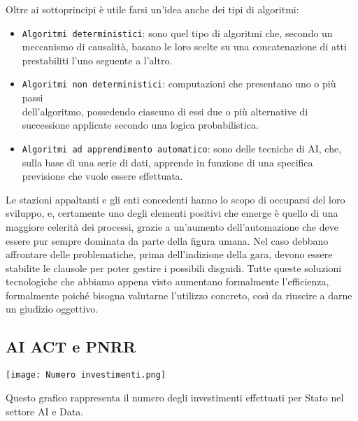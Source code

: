 \documentclass{article}
\begin{document}
\begin{justify}
\begin{itemize}
    \end{itemize}
    Oltre ai sottoprincipi è utile farsi un'idea anche dei tipi di algoritmi:
    \begin{itemize}
        \item \texttt{Algoritmi deterministici}: sono quel tipo di algoritmi che, secondo un meccanismo di causalità, basano le loro scelte su una concatenazione di atti prestabiliti l'uno seguente a l'altro.
        \item \texttt{Algoritmi non deterministici}: computazioni che presentano uno o più passi\\ dell'algoritmo, possedendo ciascuno di essi due o più alternative di successione applicate secondo una logica probabilistica.
        \item \texttt{Algoritmi ad apprendimento automatico}: sono delle tecniche di AI, che, sulla base di una serie di dati, apprende in funzione di una specifica previsione che vuole essere effettuata.
    \end{itemize}
    Le stazioni appaltanti e gli enti concedenti hanno lo scopo di occuparsi del loro sviluppo, e, certamente uno degli elementi positivi che emerge è quello di una maggiore celerità dei processi, grazie a un'aumento dell'automazione che deve essere pur sempre dominata da parte della figura umana. Nel caso debbano affrontare delle problematiche, prima dell'indizione della gara, devono essere stabilite le clausole per poter gestire i possibili disguidi.
    Tutte queste soluzioni tecnologiche che abbiamo appena visto aumentano formalmente l'efficienza, formalmente poiché bisogna valutarne l'utilizzo concreto, così da riuscire a darne un giudizio oggettivo.\\
\end{justify}

\newpage\subsection{AI ACT e PNRR}
\begin{center}
    \texttt{[image: Numero investimenti.png]}
\end{center}
\begin{center}
    Questo grafico rappresenta il numero degli investimenti effettuati per Stato nel settore AI e Data.\citep{OECD_AI}
\end{center}
\end{document}
